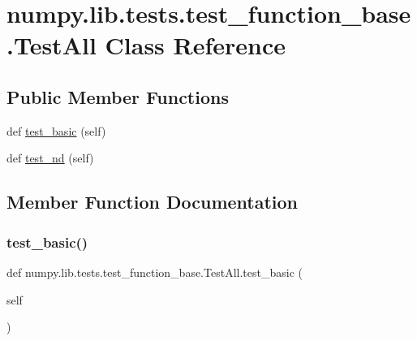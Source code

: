 \hypertarget{classnumpy_1_1lib_1_1tests_1_1test__function__base_1_1TestAll}{}\section{numpy.\+lib.\+tests.\+test\+\_\+function\+\_\+base.\+Test\+All Class Reference}
\label{classnumpy_1_1lib_1_1tests_1_1test__function__base_1_1TestAll}
\subsection*{Public Member Functions}
\begin{DoxyCompactItemize}
\item 
def \hyperlink{classnumpy_1_1lib_1_1tests_1_1test__function__base_1_1TestAll_a64383c2e68ad6dd81cebdaf1b1bd7b2f}{test\+\_\+basic} (self)
\item 
def \hyperlink{classnumpy_1_1lib_1_1tests_1_1test__function__base_1_1TestAll_a50ed98e93b306f00c907009586dc58db}{test\+\_\+nd} (self)
\end{DoxyCompactItemize}


\subsection{Member Function Documentation}
\mbox{\label{classnumpy_1_1lib_1_1tests_1_1test__function__base_1_1TestAll_a64383c2e68ad6dd81cebdaf1b1bd7b2f}} 
\subsubsection{\texorpdfstring{test\+\_\+basic()}{test\_basic()}}
{\footnotesize\ttfamily def numpy.\+lib.\+tests.\+test\+\_\+function\+\_\+base.\+Test\+All.\+test\+\_\+basic (\begin{DoxyParamCaption}\item[{}]{self }\end{DoxyParamCaption})}

